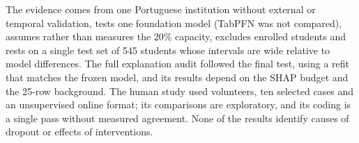 The evidence comes from one Portuguese institution without external or temporal validation, tests
one foundation model (TabPFN was not compared), assumes rather than measures the 20\% capacity,
excludes enrolled students and rests on a single test set of 545 students whose intervals are wide relative to
model differences. The full explanation audit followed the final test, using a refit that matches
the frozen model, and its results depend on the SHAP budget and the 25-row background. The human
study used volunteers, ten selected cases and an unsupervised online format; its comparisons are
exploratory, and its coding is a single pass without measured agreement. None of the results identify causes of dropout or effects of
interventions.

